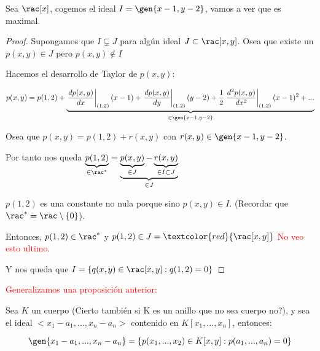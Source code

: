 \begin{example}
Sea $\rac[x]$, cogemos el ideal $I=\gen{x-1,y-2}$, vamos a ver que es maximal.

\begin{proof}
	Supongamos que $I \subsetneq J$ para algún ideal $J \subset \rac[x,y]$. Osea que existe un $p(x,y) \in J$ pero $p(x,y) \notin I$

	Hacemos el desarrollo de Taylor de $p(x,y)$:

	$$ p(x,y)=p(1,2) + \underbrace{\left.\frac{d p(x,y)}{dx}\right|_{(1,2)} (x-1)+ \left.\frac{d p(x,y)}{dy}\right|_{(1,2)} (y-2)+\frac{1}{2}\left.\frac{d^2 p(x,y)}{dx^2}\right|_{(1,2)} (x-1)^2+...}_{\in \gen{x-1,y-2}}$$

	Osea que $p(x,y)=p(1,2)+r(x,y)$ con $r(x,y) \in \gen{x-1,y-2}$.

	Por tanto nos queda $\underbrace{p(1,2)}_{\in \rac^*}=\underbrace{\underbrace{p(x,y)}_{\in J}-\underbrace{r(x,y)}_{\in I \subset J}}_{\in J}$

	$p(1,2)$ es una constante no nula porque sino $p(x,y) \in I$. (Recordar que $\rac^*=\rac\setminus\{0\}$).

	Entonces, $p(1,2) \in \rac^*$ y $p(1,2) \in J = \textcolor{red}{\rac[x,y]}$ \textcolor{red}{No veo esto ultimo}.

	Y nos queda que $I=\{ q(x,y) \in \rac[x,y]: q(1,2)=0 \}$
\end{proof}
\end{example}

\textcolor{red}{Generalizamos una proposición anterior:}
\begin{prop}
	Sea $K$ un cuerpo (Cierto también si K es un anillo que no sea cuerpo no?), y sea el ideal $<x_1-a_1,...,x_n-a_n>$ contenido en $K[x_1,...,x_n]$, entonces:

	$$\gen{x_1-a_1,...,x_n-a_n}=\{p(x_1,...,x_2)\in K[x,y]:p(a_1,...,a_n)=0 \}$$
\end{prop}

